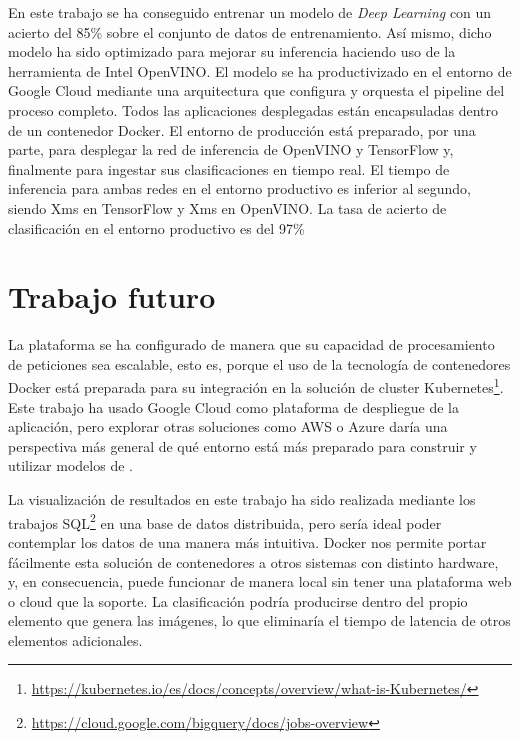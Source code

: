 En este trabajo se ha conseguido entrenar un modelo de \textit{Deep Learning} con un acierto del 85\% sobre el conjunto de datos de entrenamiento.
Así mismo, dicho modelo ha sido optimizado para mejorar su inferencia haciendo uso de la herramienta de Intel OpenVINO\@.
El modelo se ha productivizado en el entorno de Google Cloud mediante una arquitectura que configura y orquesta el pipeline del proceso completo. Todos las aplicaciones desplegadas están encapsuladas dentro de un contenedor Docker.
El entorno de producción está preparado, por una parte, para desplegar la red de inferencia de OpenVINO y TensorFlow y, finalmente para ingestar sus clasificaciones en tiempo real.
El tiempo de inferencia para ambas redes en el entorno productivo es inferior al segundo, siendo Xms en TensorFlow y Xms en OpenVINO\@.
La tasa de acierto de clasificación en el entorno productivo es del 97\%

\section{Trabajo futuro}\label{sec:trabajo-futuro}
La plataforma se ha configurado de manera que su capacidad de procesamiento de peticiones sea escalable, esto es, porque el uso de la tecnología de contenedores Docker está preparada para su integración en la solución de cluster Kubernetes\footnote{\url{https://kubernetes.io/es/docs/concepts/overview/what-is-Kubernetes/}}.
Este trabajo ha usado Google Cloud como plataforma de despliegue de la aplicación, pero explorar otras soluciones como AWS o Azure daría una perspectiva más general de qué entorno está más preparado para construir y utilizar modelos de .

La visualización de resultados en este trabajo ha sido realizada mediante los trabajos SQL\footnote{\url{https://cloud.google.com/bigquery/docs/jobs-overview}} en una base de datos distribuida, pero sería ideal poder contemplar los datos de una manera más intuitiva.
Docker nos permite portar fácilmente esta solución de contenedores a otros sistemas con distinto hardware, y, en consecuencia, puede funcionar de manera local sin tener una plataforma web o cloud que la soporte.
La clasificación podría producirse dentro del propio elemento que genera las imágenes, lo que eliminaría el tiempo de latencia de otros elementos adicionales.

